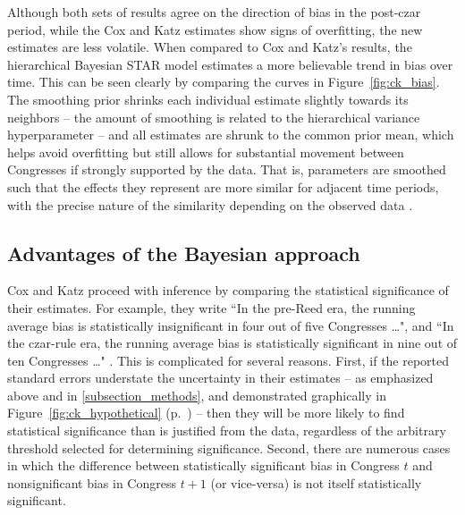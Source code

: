 Although both sets of results agree on the direction of bias in the post-czar period, 
while the Cox and Katz estimates show signs of overfitting, the new estimates are less volatile. 
When compared to Cox and Katz's results, the hierarchical Bayesian STAR model estimates 
a more believable trend in bias over time. This can be seen clearly by comparing the curves 
in Figure~\ref{fig:ck_bias}. The smoothing prior shrinks each individual estimate slightly 
towards its neighbors -- the amount of smoothing is related to the hierarchical variance 
hyperparameter -- and all estimates are shrunk to the common prior mean, which helps 
avoid overfitting but still allows for substantial movement between Congresses 
if strongly supported by the data. That is, parameters are smoothed such that the effects 
they represent are more similar for adjacent time periods, with the precise nature of the 
similarity depending on the observed data 
. 



\subsection{Advantages of the Bayesian approach}

Cox and Katz proceed with inference by comparing the statistical significance of their 
estimates. For example, they write ``In the pre-Reed era, the running average 
bias is statistically insignificant in four out of five Congresses \dots", and ``In the czar-rule era, 
the running average bias is statistically significant in nine out of ten Congresses \dots" 
. This is complicated for several reasons.
First, if the reported standard errors understate the uncertainty in their estimates 
-- as emphasized above and in \ref{subsection_methods}, 
and demonstrated graphically in Figure~\ref{fig:ck_hypothetical} (p.~\pageref{fig:ck_hypothetical})
-- then they will be more likely to find statistical significance than is justified from the data, 
regardless of the arbitrary threshold selected for determining significance. Second, there
are numerous cases in which the difference between statistically significant bias in Congress 
$t$ and nonsignificant bias in Congress $t + 1$ (or vice-versa) is not itself statistically significant. 

